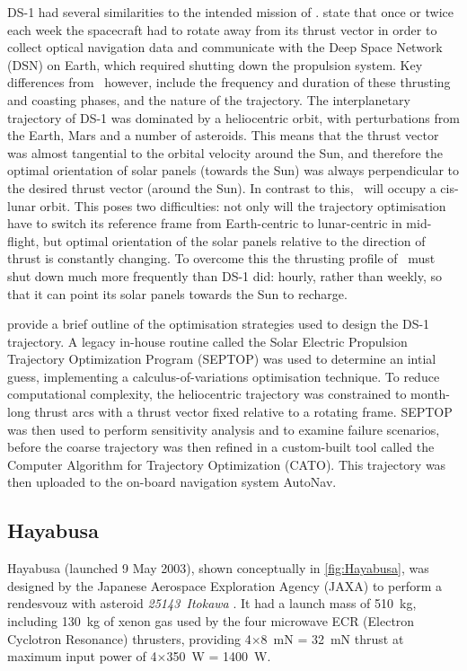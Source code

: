 DS-1 had several similarities to the intended mission of \BW. \textcite{Rayman1997} state that once or twice each week the spacecraft had to rotate away from its thrust vector in order to collect optical navigation data and communicate with the Deep Space Network (DSN) on Earth, which required shutting down the propulsion system. Key differences from \BW\ however, include the frequency and duration of these thrusting and coasting phases, and the nature of the trajectory. The interplanetary trajectory of DS-1 was dominated by a heliocentric orbit, with perturbations from the Earth, Mars and a number of asteroids. This means that the thrust vector was almost tangential to the orbital velocity around the Sun, and therefore the optimal orientation of solar panels (towards the Sun) was always perpendicular to the desired thrust vector (around the Sun). In contrast to this, \BW\ will occupy a cis-lunar orbit. This poses two difficulties: not only will the trajectory optimisation have to switch its reference frame from Earth-centric to lunar-centric in mid-flight, but optimal orientation of the solar panels relative to the direction of thrust is constantly changing. To overcome this the thrusting profile of \BW\ must shut down much more frequently than DS-1 did: hourly, rather than weekly, so that it can point its solar panels towards the Sun to recharge.

\textcite{Rayman1999} provide a brief outline of the optimisation strategies used to design the DS-1 trajectory. A legacy in-house routine called the Solar Electric Propulsion Trajectory Optimization Program (SEPTOP) was used to determine an intial guess, implementing a calculus-of-variations optimisation technique. To reduce computational complexity, the heliocentric trajectory was constrained to month-long thrust arcs with a thrust vector fixed relative to a rotating frame. 
SEPTOP was then used to perform sensitivity analysis and to examine failure scenarios, before the coarse trajectory was then refined in a custom-built tool called the Computer Algorithm for Trajectory Optimization (CATO). This trajectory was then uploaded to the on-board navigation system AutoNav.

\subsection{Hayabusa}
Hayabusa (launched 9 May 2003), shown conceptually in \autoref{fig:Hayabusa}, was designed by the Japanese Aerospace Exploration Agency (JAXA) to perform a rendesvouz with asteroid \emph{25143~Itokawa} \parencite{web_Hayabusa}. It had a launch mass of 510~kg, including 130~kg of xenon gas used by the four microwave ECR (Electron Cyclotron Resonance) thrusters, providing 4$\times$8~mN = 32~mN thrust at maximum input power of 4$\times$350~W = 1400~W. 

